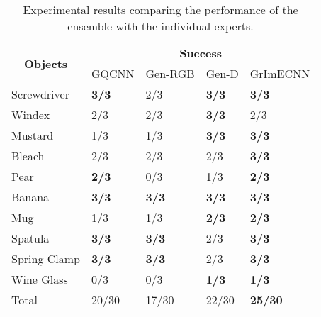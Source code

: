 \documentclass[letterpaper, 10 pt, conference]{ieeeconf}
\begin{document}
\begin{table}[]
\begin{center}
\caption{Experimental results comparing the performance of the ensemble with the individual experts.}
\label{table:results}
\begin{tabular}{l|l|l|l|l}
\hline
\multicolumn{1}{c|}{\multirow{2}{*}{\textbf{Objects}}} & \multicolumn{4}{c}{\textbf{Success}}                                            \\ \cline{2-5} 
\multicolumn{1}{c|}{}                                   & GQCNN & Gen-RGB & Gen-D & GrImECNN\\ \hline
Screwdriver                                             & \textbf{3/3}     & 2/3                    & \textbf{3/3}           & \textbf{3/3}\\
Windex                                                  & 2/3              & 2/3                    & \textbf{3/3}        & 2/3\\
Mustard                                                 & 1/3              & 1/3                    & \textbf{3/3}        & \textbf{3/3}      \\
Bleach                                                  & 2/3              & 2/3                    & 2/3                 & \textbf{3/3}           \\
Pear                                                    & \textbf{2/3}     & 0/3                    & 1/3                 & \textbf{2/3}       \\
Banana                                                  & \textbf{3/3}     & \textbf{3/3}           & \textbf{3/3}        & \textbf{3/3}  \\
Mug                                                     & 1/3              & 1/3                    & \textbf{2/3}        & \textbf{2/3} \\
Spatula                                                 & \textbf{3/3}     & \textbf{3/3}           & 2/3                 & \textbf{3/3} \\
Spring Clamp                                           & \textbf{3/3}     & \textbf{3/3}           & 2/3                 & \textbf{3/3} \\
Wine Glass                                              & 0/3              & 0/3                    & \textbf{1/3}        & \textbf{1/3} \\ \hline
Total                                                  & 20/30              & 17/30                   & 22/30                & \textbf{25/30} \\ \hline
\end{tabular}
\end{center}
\end{table}
\end{document}
